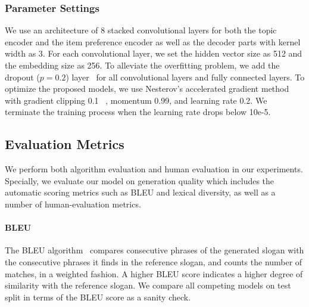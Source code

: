 \subsubsection{Parameter Settings}
We use an architecture of 8 stacked convolutional layers 
for both the topic encoder and the item preference encoder
as well as the decoder parts with kernel width as 3.
For each convolutional layer, we set the hidden vector size as 512
and the embedding size as 256.
To alleviate the overfitting problem, we add the dropout ($p=0.2$)
layer~\cite{srivastava2014dropout} for all convolutional layers and fully connected layers.
To optimize the proposed models,
we use Nesterov's accelerated gradient method
~\cite{sutskever2013importance} with gradient clipping 0.1
~\cite{pascanu2013difficulty},
momentum 0.99, and 
learning rate 0.2.
We terminate the training process when the learning rate drops 
below 10e-5.





\subsection{Evaluation Metrics}
\label{sec:metrics}
We perform both algorithm evaluation and human evaluation
in our experiments.
Specially, we evaluate our model on generation quality which includes
the automatic scoring metrics such as
BLEU and lexical diversity,
as well as a number of human-evaluation metrics.

\paragraph{BLEU}
The BLEU algorithm~\cite{papineni2002bleu} compares consecutive phrases of the 
generated slogan with the consecutive phrases it finds
in the reference slogan, and counts the number of matches, in a weighted fashion.
A higher BLEU score indicates a higher degree of similarity with the reference
slogan.
We compare all competing models on test split in terms of the BLEU score as a sanity check.


